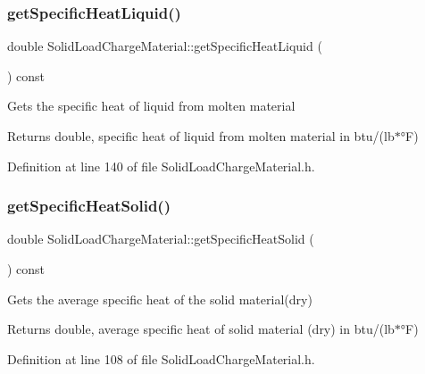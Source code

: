 \subsubsection{\texorpdfstring{get\+Specific\+Heat\+Liquid()}{getSpecificHeatLiquid()}\hspace{0.1cm}{\footnotesize\ttfamily [3/3]}}
{\footnotesize\ttfamily double Solid\+Load\+Charge\+Material\+::get\+Specific\+Heat\+Liquid (\begin{DoxyParamCaption}{ }\end{DoxyParamCaption}) const\hspace{0.3cm}{\ttfamily [inline]}}

Gets the specific heat of liquid from molten material \begin{DoxyReturn}{Returns}
double, specific heat of liquid from molten material in btu/(lb$\ast$°F) 
\end{DoxyReturn}


Definition at line 140 of file Solid\+Load\+Charge\+Material.\+h.

\mbox{\label{class_solid_load_charge_material_af84f1f7dd167f67c0c02206339bbfe27}} 
\subsubsection{\texorpdfstring{get\+Specific\+Heat\+Solid()}{getSpecificHeatSolid()}\hspace{0.1cm}{\footnotesize\ttfamily [1/3]}}
{\footnotesize\ttfamily double Solid\+Load\+Charge\+Material\+::get\+Specific\+Heat\+Solid (\begin{DoxyParamCaption}{ }\end{DoxyParamCaption}) const\hspace{0.3cm}{\ttfamily [inline]}}

Gets the average specific heat of the solid material(dry) \begin{DoxyReturn}{Returns}
double, average specific heat of solid material (dry) in btu/(lb$\ast$°F) 
\end{DoxyReturn}


Definition at line 108 of file Solid\+Load\+Charge\+Material.\+h.

\mbox{\label{class_solid_load_charge_material_af84f1f7dd167f67c0c02206339bbfe27}} 
